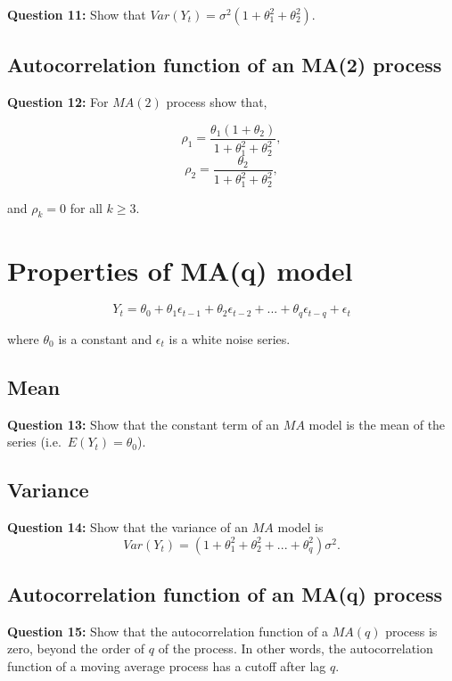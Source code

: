 \documentclass[
  11pt,
  a4paper,
]{report}
\begin{document}
\textbf{Question 11: } Show that
\(Var(Y_t) = \sigma^2 (1+\theta_1^2 + \theta_2^2).\)

\subsection{Autocorrelation function of an MA(2)
process}\label{autocorrelation-function-of-an-ma2-process}

\textbf{Question 12: }For \(MA(2)\) process show that,

\[\rho_1=\frac{\theta_1(1+\theta_2)}{1+\theta_1^2+\theta_2^2},\]
\[\rho_2 = \frac{\theta_2}{1+\theta_1^2 + \theta_2^2},\]

and \(\rho_k=0\) for all \(k \geq 3.\)

\section{Properties of MA(q) model}\label{properties-of-maq-model}

\begin{equation}
Y_t = \theta_0 + \theta_1 \epsilon_{t-1} + \theta_2 \epsilon_{t-2} +...+ \theta_q \epsilon_{t-q} +\epsilon_t
\end{equation}

where \(\theta_0\) is a constant and \({\epsilon_t}\) is a white noise
series.

\subsection{Mean}\label{mean-5}

\textbf{Question 13:} Show that the constant term of an \(MA\) model is
the mean of the series (i.e.~\(E(Y_t)=\theta_0\)).

\subsection{Variance}\label{variance-4}

\textbf{Question 14:} Show that the variance of an \(MA\) model is
\[Var(Y_t)=(1+\theta_1^2+\theta_2^2+...+\theta_q^2)\sigma^2.\]

\subsection{Autocorrelation function of an MA(q)
process}\label{autocorrelation-function-of-an-maq-process}

\textbf{Question 15:} Show that the autocorrelation function of a
\(MA(q)\) process is zero, beyond the order of \(q\) of the process. In
other words, the autocorrelation function of a moving average process
has a cutoff after lag \(q\).
\end{document}
